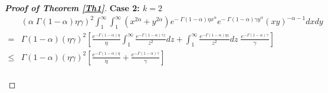 \documentclass[11pt, reqno]{amsart}
\numberwithin{equation}{section}
\theoremstyle{plain} %
\theoremstyle{definition} %
\begin{document}
\begin{proof}[{\bf Proof of Theorem \ref{Th1}}]
{\bf  Case 2: $k=2$}
     \begin{align*}
&\left(\alpha  \;  \Gamma(1-\alpha) \eta \gamma \right)^2   \int^{\infty}_{1} \int^{\infty}_{1}  \left( x^{2\alpha } + y^{2\alpha }  \right)      e^{-   \;  \Gamma(1-\alpha) \eta x^{\alpha}} e^{-   \;  \Gamma(1-\alpha) \gamma y^{\alpha}}  (xy)^{-\alpha -1} dx dy \\
= &\Gamma(1-\alpha)   \left(\eta \gamma \right)^2  \left[  \frac{e^{-   \Gamma(1-\alpha)  \eta}}{   \eta} \int^{\infty}_{1} \frac{e^{-   \Gamma(1-\alpha)   \gamma   z }}{z^2} dz   + \int^{\infty}_{1} \frac{e^{-   \Gamma(1-\alpha)  \eta   z }}{z^2} dz \;  \frac{e^{-   \Gamma(1-\alpha)  \gamma}}{   \gamma}  \right]\\
 \leq & \Gamma(1-\alpha)    \left( \eta \gamma \right)^2  \left[  \frac{e^{-   \Gamma(1-\alpha)   \eta}}{  \eta} +  \frac{e^{-   \Gamma(1-\alpha)  \gamma}}{   \gamma}  \right] 
\end{align*}\\


\end{proof}
\end{document}
